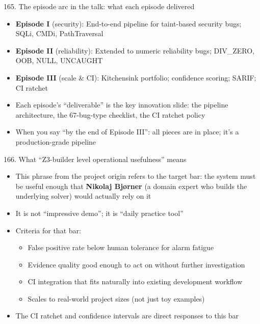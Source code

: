 \documentclass[aspectratio=169]{beamer}
\begin{document}
\begin{frame}{165. The episode arc in the talk: what each episode delivered}
\begin{itemize}
  \item \textbf{Episode I} (security): End-to-end pipeline for taint-based security bugs; SQLi, CMDi, PathTraversal
  \item \textbf{Episode II} (reliability): Extended to numeric reliability bugs; DIV\_ZERO, OOB, NULL, UNCAUGHT
  \item \textbf{Episode III} (scale \& CI): Kitchensink portfolio; confidence scoring; SARIF; CI ratchet
  \item Each episode's ``deliverable'' is the key innovation slide: the pipeline architecture, the 67-bug-type checklist, the CI ratchet policy
  \item When you say ``by the end of Episode III'': all pieces are in place; it's a production-grade pipeline
\end{itemize}
\end{frame}

\begin{frame}{166. What ``Z3-builder level operational usefulness'' means}
\begin{itemize}
  \item This phrase from the project origin refers to the target bar: the system must be useful enough that \textbf{Nikolaj Bj\o rner} (a domain expert who builds the underlying solver) would actually rely on it
  \item It is not ``impressive demo''; it is ``daily practice tool''
  \item Criteria for that bar:
    \begin{itemize}
      \item False positive rate below human tolerance for alarm fatigue
      \item Evidence quality good enough to act on without further investigation
      \item CI integration that fits naturally into existing development workflow
      \item Scales to real-world project sizes (not just toy examples)
    \end{itemize}
  \item The CI ratchet and confidence intervals are direct responses to this bar
\end{itemize}
\end{frame}

\end{document}
